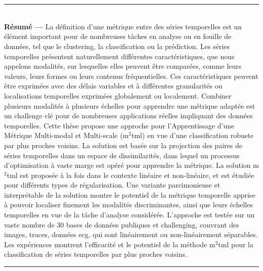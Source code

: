 \chapter*{}
\thispagestyle{empty}
\noindent\rule[2pt]{\textwidth}{0.5pt}
\\
{\large\textbf{Résumé ---}}
    La définition d'une métrique entre des séries temporelles est un élément important pour de nombreuses tâches en analyse ou en fouille de données, tel que le clustering, la classification ou la prédiction. Les séries temporelles présentent naturellement différentes caractéristiques, que nous appelons modalités, sur lesquelles elles peuvent être comparées, comme leurs valeurs, leurs formes ou leurs contenus fréquentielles. Ces caractéristiques peuvent être exprimées avec des délais variables et à différentes granularités ou localisations temporelles \textemdash exprimées globalement ou localement. Combiner plusieurs modalités à plusieurs échelles pour apprendre une métrique adaptée est un challenge clé pour de nombreuses applications réelles impliquant des données temporelles. Cette thèse propose une approche pour l'Apprentissage d'une Métrique Multi-modal et Multi-scale ({\sc m}$^2${\sc tml}) en vue d'une classification robuste par plus proches voisins. La solution est basée sur la projection des paires de séries temporelles dans un espace de dissimilarités, dans lequel un processus d'optimisation à vaste marge est opéré pour apprendre la métrique. La solution {\sc m}$^2${\sc tml} est proposée à la fois dans le contexte linéaire et non-linéaire, et est étudiée pour différents types de régularisation. Une variante parcimonieuse et interprétable de la solution montre le potentiel de la métrique temporelle apprise à pouvoir localiser finement les modalités discriminantes, ainsi que leurs échelles temporelles en vue de la tâche d'analyse considérée. L'approche est testée sur un vaste nombre de 30 bases de données publiques et challenging, couvrant des images, traces, données {\sc ecg}, qui sont linéairement ou non-linéairement séparables. Les expériences montrent l'efficacité et le potentiel de la méthode {\sc m}$^2${\sc tml} pour la classification de séries temporelles par plus proches voisins.
\\
\noindent\rule[2pt]{\textwidth}{0.5pt}



